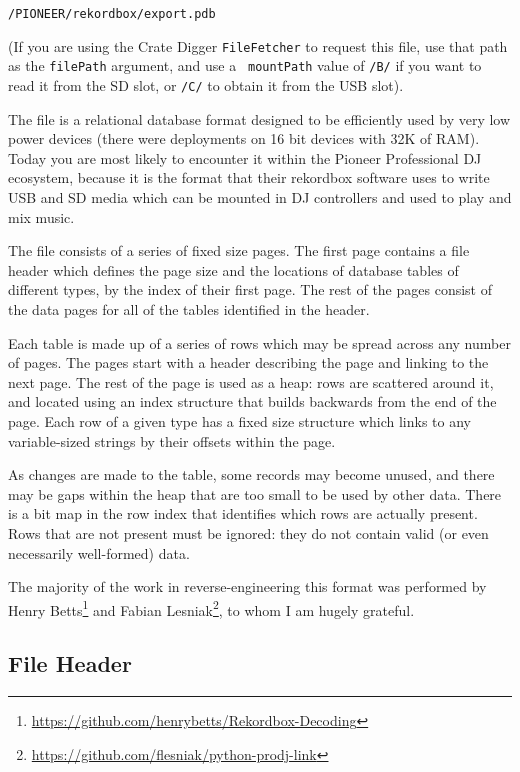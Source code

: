 \documentclass[11pt]{article}
\begin{document}
\begin{center}
  {\tt /PIONEER/rekordbox/export.pdb}
\end{center}

(If you are using the Crate Digger {\tt FileFetcher} to request this
file, use that path as the {\tt filePath} argument, and use a {\tt
  mountPath} value of {\tt /B/} if you want to read it from the SD
slot, or {\tt /C/} to obtain it from the USB slot).

The file is a relational database format designed to be efficiently
used by very low power devices (there were deployments on 16 bit
devices with 32K of RAM). Today you are most likely to encounter it
within the Pioneer Professional DJ ecosystem, because it is the format
that their rekordbox software uses to write USB and SD media which can
be mounted in DJ controllers and used to play and mix music.

The file consists of a series of fixed size pages. The first page
contains a file header which defines the page size and the locations
of database tables of different types, by the index of their first
page. The rest of the pages consist of the data pages for all of the
tables identified in the header.

Each table is made up of a series of rows which may be spread across
any number of pages. The pages start with a header describing the page
and linking to the next page. The rest of the page is used as a heap:
rows are scattered around it, and located using an index structure
that builds backwards from the end of the page. Each row of a given
type has a fixed size structure which links to any variable-sized
strings by their offsets within the page.

As changes are made to the table, some records may become unused, and
there may be gaps within the heap that are too small to be used by
other data. There is a bit map in the row index that identifies which
rows are actually present. Rows that are not present must be ignored:
they do not contain valid (or even necessarily well-formed) data.

The majority of the work in reverse-engineering this format was
performed by Henry
Betts\footnote{\url{https://github.com/henrybetts/Rekordbox-Decoding}}
and Fabian
Lesniak\footnote{\url{https://github.com/flesniak/python-prodj-link}},
to whom I am hugely grateful.

\subsection{File Header}
\label{sec:fileHeader}
\end{document}

